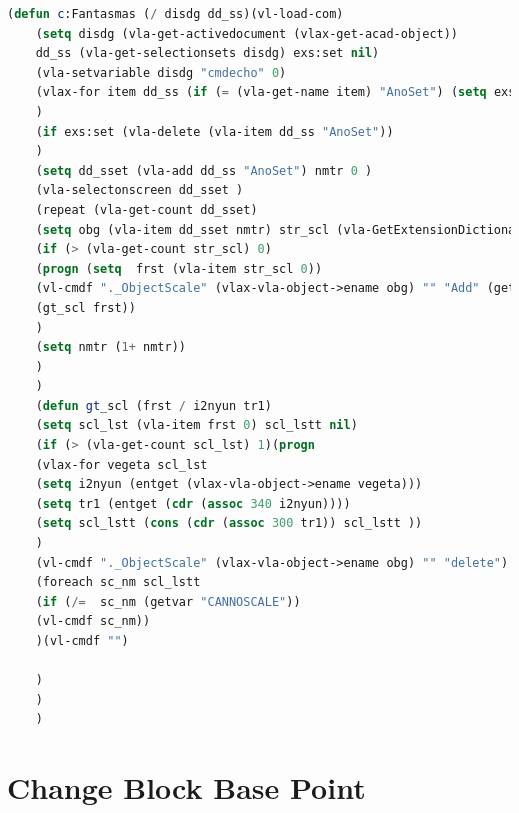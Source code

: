 \documentclass[12pt,letterpaper,final]{report}
\begin{document}
\begin{lstlisting}[language=Lisp]
	(defun c:Fantasmas (/ disdg dd_ss)(vl-load-com)
	(setq disdg (vla-get-activedocument (vlax-get-acad-object))
	dd_ss (vla-get-selectionsets disdg) exs:set nil)
	(vla-setvariable disdg "cmdecho" 0)
	(vlax-for item dd_ss (if (= (vla-get-name item) "AnoSet") (setq exs:set T))
	)
	(if exs:set (vla-delete (vla-item dd_ss "AnoSet"))
	)
	(setq dd_sset (vla-add dd_ss "AnoSet") nmtr 0 )
	(vla-selectonscreen dd_sset )
	(repeat (vla-get-count dd_sset)
	(setq obg (vla-item dd_sset nmtr) str_scl (vla-GetExtensionDictionary obg))
	(if (> (vla-get-count str_scl) 0)
	(progn (setq  frst (vla-item str_scl 0))
	(vl-cmdf "._ObjectScale" (vlax-vla-object->ename obg) "" "Add" (getvar "CANNOSCALE") "")
	(gt_scl frst))
	)
	(setq nmtr (1+ nmtr))
	)
	)
	(defun gt_scl (frst / i2nyun tr1) 
	(setq scl_lst (vla-item frst 0) scl_lstt nil)
	(if (> (vla-get-count scl_lst) 1)(progn
	(vlax-for vegeta scl_lst  
	(setq i2nyun (entget (vlax-vla-object->ename vegeta)))
	(setq tr1 (entget (cdr (assoc 340 i2nyun))))
	(setq scl_lstt (cons (cdr (assoc 300 tr1)) scl_lstt ))
	)
	(vl-cmdf "._ObjectScale" (vlax-vla-object->ename obg) "" "delete")
	(foreach sc_nm scl_lstt
	(if (/=  sc_nm (getvar "CANNOSCALE"))
	(vl-cmdf sc_nm))
	)(vl-cmdf "")    
	
	)
	) 
	)
\end{lstlisting}


\chapter{Change Block Base Point}
\end{document}
